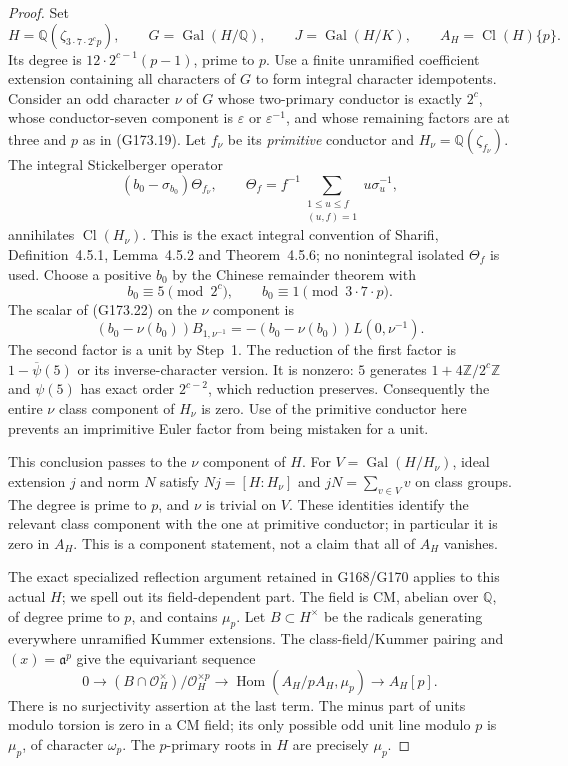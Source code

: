 \begin{proof}
Set
\[
 H=\mathbb Q(\zeta_{3\cdot7\cdot2^c p}),\qquad
 G=\operatorname{Gal}(H/\mathbb Q),\qquad
 J=\operatorname{Gal}(H/K),\qquad
 A_H=\operatorname{Cl}(H)\{p\}.
 \tag{G173.21}
\]
Its degree is $12\cdot2^{c-1}(p-1)$, prime to $p$.
Use a finite unramified coefficient extension containing all
characters of $G$ to form integral character idempotents.
Consider an odd character $\nu$ of $G$ whose two-primary conductor
is exactly $2^c$, whose conductor-seven component is
$\varepsilon$ or $\varepsilon^{-1}$, and whose remaining factors
are at three and $p$ as in (G173.19).
Let $f_\nu$ be its \emph{primitive} conductor and
$H_\nu=\mathbb Q(\zeta_{f_\nu})$.
The integral Stickelberger operator
\[
 (b_0-\sigma_{b_0})\Theta_{f_\nu},\qquad
 \Theta_f=f^{-1}\sum_{\substack{1\leq u\leq f\\(u,f)=1}}
                                      u\sigma_u^{-1},
 \tag{G173.22}
\]
annihilates $\operatorname{Cl}(H_\nu)$.
This is the exact integral convention of Sharifi,
Definition~4.5.1, Lemma~4.5.2 and Theorem~4.5.6;
no nonintegral isolated $\Theta_f$ is used.
Choose a positive $b_0$ by the Chinese remainder theorem with
\[
 b_0\equiv5\pmod {2^c},\qquad
 b_0\equiv1\pmod {3\cdot7\cdot p}.
 \tag{G173.23}
\]
The scalar of (G173.22) on the $\nu$ component is
\[
           (b_0-\nu(b_0))B_{1,\nu^{-1}}
              =-(b_0-\nu(b_0))L(0,\nu^{-1}).
 \tag{G173.24}
\]
The second factor is a unit by Step~1.  The reduction of the first
factor is $1-\overline\psi(5)$ or its inverse-character version.
It is nonzero: $5$ generates $1+4\mathbb Z/2^c\mathbb Z$ and
$\psi(5)$ has exact order $2^{c-2}$, which reduction preserves.
Consequently the entire $\nu$ class component of $H_\nu$ is zero.
Use of the primitive conductor here prevents an imprimitive
Euler factor from being mistaken for a unit.

This conclusion passes to the $\nu$ component of $H$.
For $V=\operatorname{Gal}(H/H_\nu)$, ideal extension $j$ and norm $N$
satisfy $Nj=[H:H_\nu]$ and $jN=\sum_{v\in V}v$ on class groups.
The degree is prime to $p$, and $\nu$ is trivial on $V$.
These identities identify the relevant class component with the
one at primitive conductor; in particular it is zero in $A_H$.
This is a component statement, not a claim that all of $A_H$ vanishes.

The exact specialized reflection argument retained in G168/G170
applies to this actual $H$; we spell out its field-dependent part.
The field is CM, abelian over $\mathbb Q$, of degree prime to $p$,
and contains $\mu_p$.
Let $B\subset H^\times$ be the radicals generating everywhere
unramified Kummer extensions.  The class-field/Kummer pairing and
$(x)=\mathfrak a^p$ give the equivariant sequence
\[
 0\longrightarrow
       (B\cap\mathcal O_H^\times)/\mathcal O_H^{\times p}
 \longrightarrow\operatorname{Hom}(A_H/pA_H,\mu_p)
 \longrightarrow A_H[p].
 \tag{G173.25}
\]
There is no surjectivity assertion at the last term.
The minus part of units modulo torsion is zero in a CM field;
its only possible odd unit line modulo $p$ is $\mu_p$, of character
$\omega_p$.  The $p$-primary roots in $H$ are precisely $\mu_p$.


\end{proof}
